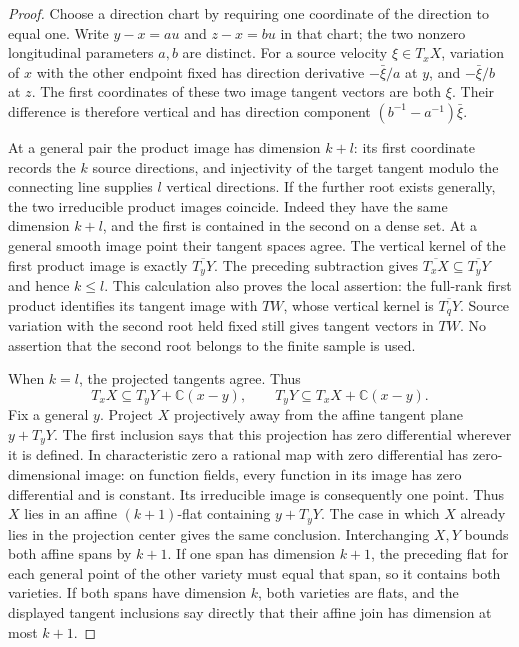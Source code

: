 \begin{proof}
Choose a direction chart by requiring one coordinate of the direction to equal one. Write $y-x=a u$ and $z-x=b u$ in that chart; the two nonzero longitudinal parameters $a,b$ are distinct. For a source velocity $\xi\in T_xX$, variation of $x$ with the other endpoint fixed has direction derivative $-\bar\xi/a$ at $y$, and $-\bar\xi/b$ at $z$. The first coordinates of these two image tangent vectors are both $\xi$. Their difference is therefore vertical and has direction component $(b^{-1}-a^{-1})\bar\xi$.

At a general pair the product image has dimension $k+l$: its first coordinate records the $k$ source directions, and injectivity of the target tangent modulo the connecting line supplies $l$ vertical directions. If the further root exists generally, the two irreducible product images coincide. Indeed they have the same dimension $k+l$, and the first is contained in the second on a dense set. At a general smooth image point their tangent spaces agree. The vertical kernel of the first product image is exactly $\overline{T_yY}$. The preceding subtraction gives $\overline{T_xX}\subseteq\overline{T_yY}$ and hence $k\le l$. This calculation also proves the local assertion: the full-rank first product identifies its tangent image with $T W$, whose vertical kernel is $\overline{T_qY}$. Source variation with the second root held fixed still gives tangent vectors in $T W$. No assertion that the second root belongs to the finite sample is used.

When $k=l$, the projected tangents agree. Thus
\[
 T_xX\subseteq T_yY+\mathbb{C}(x-y),
 \qquad
 T_yY\subseteq T_xX+\mathbb{C}(x-y).
\]
Fix a general $y$. Project $X$ projectively away from the affine tangent plane $y+T_yY$. The first inclusion says that this projection has zero differential wherever it is defined. In characteristic zero a rational map with zero differential has zero-dimensional image: on function fields, every function in its image has zero differential and is constant. Its irreducible image is consequently one point. Thus $X$ lies in an affine $(k+1)$-flat containing $y+T_yY$. The case in which $X$ already lies in the projection center gives the same conclusion. Interchanging $X,Y$ bounds both affine spans by $k+1$. If one span has dimension $k+1$, the preceding flat for each general point of the other variety must equal that span, so it contains both varieties. If both spans have dimension $k$, both varieties are flats, and the displayed tangent inclusions say directly that their affine join has dimension at most $k+1$.
\end{proof}

